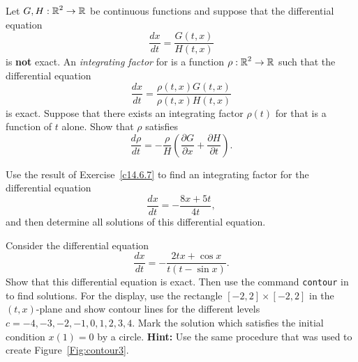 \documentclass{ximera}
\begin{document}
\begin{exercise} \label{c14.6.7}
Let $G,H:\mbox{$\Bbb{R}$}^2\to\mbox{$\Bbb{R}$}$ be continuous functions and suppose that the differential 
equation 
\begin{equation}  \label{eq:if1}
\frac{dx}{dt} = \frac{G(t,x)}{H(t,x)}
\end{equation}
is {\bf not} exact.   An {\em integrating factor\/} for  is 
a function $\rho:\mbox{$\Bbb{R}$}^2\rightarrow\mbox{$\Bbb{R}$}$ such that the differential equation
\[
\frac{dx}{dt} = \frac{\rho(t,x) G(t,x)}{\rho(t,x)H(t,x)}
\]
is exact.  Suppose that there exists an integrating factor $\rho(t)$ for 
 that is a function of $t$ alone.  Show that $\rho$ satisfies
\[
\frac{d\rho}{dt} = -\frac{\rho}{H}
\left( \frac{\partial G}{\partial x}+\frac{\partial H}{\partial t}\right).
\]
\end{exercise}

\begin{exercise} \label{c14.6.7A}
Use the result of Exercise~\ref{c14.6.7} to find an integrating factor for 
the differential equation
\[
\frac{dx}{dt} = -\frac{8x+5t}{4t},
\]
and then determine all solutions of this differential equation.
\end{exercise}

\CEXER


\begin{exercise} \label{c14.6.8}
Consider the differential equation
\[
\frac{dx}{dt} = -\frac{2tx+\cos x}{t(t-\sin x)}.
\]
Show that this differential equation is 
exact.  Then use the command {\tt contour} in \Matlab 
to find solutions.  For the display, 
use the rectangle $[-2,2]\times [-2,2]$ in the $(t,x)$-plane and show contour
lines for the different levels $c=-4,-3,-2,-1,0,1,2,3,4$.  Mark the solution
which satisfies the initial condition $x(1)=0$ by a circle.
{\bf Hint:} Use the same procedure that was used to create 
Figure~\ref{Fig:contour3}.
\end{exercise}
\end{document}
